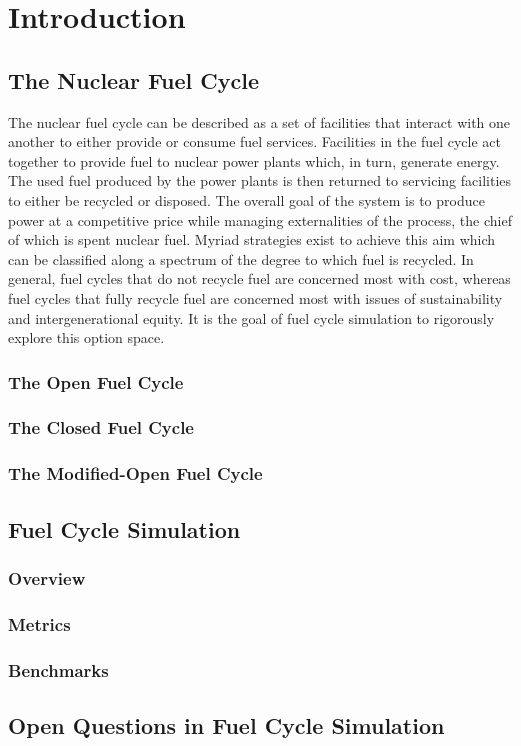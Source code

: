 \chapter{Introduction}\label{ch:intro}

\section{The Nuclear Fuel Cycle}

The nuclear fuel cycle can be described as a set of facilities that interact
with one another to either provide or consume fuel services. Facilities in the
fuel cycle act together to provide fuel to nuclear power plants which, in turn,
generate energy. The used fuel produced by the power plants is then returned to
servicing facilities to either be recycled or disposed. The overall goal of the
system is to produce power at a competitive price while managing externalities
of the process, the chief of which is spent nuclear fuel. Myriad strategies
exist to achieve this aim which can be classified along a spectrum of the degree
to which fuel is recycled. In general, fuel cycles that do not recycle fuel are
concerned most with cost, whereas fuel cycles that fully recycle fuel are
concerned most with issues of sustainability and intergenerational equity. It is
the goal of fuel cycle simulation to rigorously explore this option space.

\subsection{The Open Fuel Cycle}


\subsection{The Closed Fuel Cycle}


\subsection{The Modified-Open Fuel Cycle}


\section{Fuel Cycle Simulation}

\subsection{Overview}\label{sec:simulators-overview}


\subsection{Metrics}


\subsection{Benchmarks}\label{sec:intro-benchmarks}


\section{Open Questions in Fuel Cycle Simulation}

